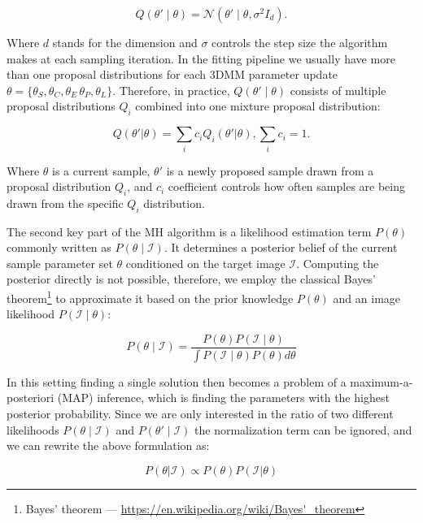 \begin{equation}
   Q(\theta'\mid\theta) = \mathcal{N}(\theta'\mid\theta, \sigma^2 I_d). 
   \label{2.5}
\end{equation}

Where $d$ stands for the dimension and $\sigma$ controls the step size the algorithm makes at each sampling iteration. In the fitting pipeline we usually have more than one proposal distributions for each 3DMM parameter update $\theta = \{\theta_S, \theta_C, \theta_E\, \theta_P, \theta_L\}$. Therefore, in practice, $Q(\theta'\mid\theta)$ consists of multiple proposal distributions $Q_i$ combined into one mixture proposal distribution:

\begin{equation}
    Q(\theta' | \theta) = \sum_i c_i Q_i(\theta'|\theta), \sum_i c_i = 1.
    \label{eq2.3}
\end{equation} 

Where $\theta$ is a current sample, $\theta'$ is a newly proposed sample drawn from a proposal distribution $Q_i$, and $c_i$ coefficient controls how often samples are being drawn from the specific $Q_i$ distribution\cite{Schoenborn2017}.\bigskip

The second key part of the MH algorithm is a likelihood estimation term $P(\theta)$ commonly written as $P(\theta\mid\mathcal{I})$. It determines a posterior belief of the current sample parameter set $\theta$ conditioned on the target image $\mathcal{I}$. Computing the posterior directly is not possible, therefore, we employ the classical Bayes' theorem\footnote{Bayes' theorem — \url{https://en.wikipedia.org/wiki/Bayes'\_theorem}} to approximate it based on the prior knowledge $P(\theta)$ and an image likelihood $P(\mathcal{I}\mid\theta)$:

\begin{equation}
    P(\theta \mid \mathcal{I}) = \frac{P(\theta)P(\mathcal{I}\mid \theta)}{\int P(\mathcal{I}\mid \theta)P(\theta)d\theta}
\end{equation}

In this setting finding a single solution then becomes a problem of a maximum-a-posteriori (MAP) inference, which is finding the parameters with the highest posterior probability\cite{10.1007/978-3-642-40602-7_11}. Since we are only interested in the ratio of two different likelihoods $P(\theta\mid\mathcal{I})$ and $P(\theta'\mid\mathcal{I})$ the normalization term can be ignored, and we can rewrite the above formulation as:

\begin{equation}
    P(\theta | \mathcal{I}) \propto P(\theta)P(\mathcal{I} | \theta)
    \label{eq2.5}
\end{equation}

